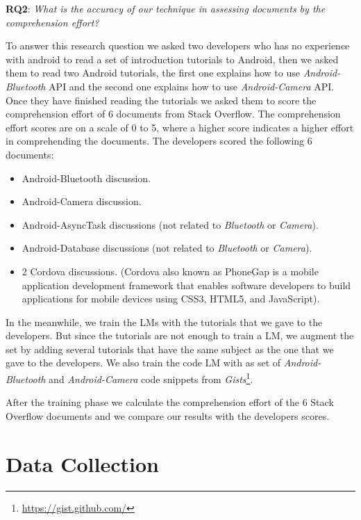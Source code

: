 \documentclass[12pt,mscthesis]{usiinfthesis}
\begin{document}
		{\textbf{RQ2}: \emph{What is the accuracy of our technique in assessing documents by the comprehension effort?}


		To answer this research question we asked two developers who has no experience with android to read a set of introduction tutorials to Android, then we asked them to read two Android tutorials, the first one explains how to use \emph{Android-Bluetooth} API and the second one explains how to use \emph{Android-Camera} API. Once they have finished reading the tutorials we asked them to score the comprehension effort of 6 documents from Stack Overflow. The comprehension effort scores are on a scale of 0 to 5, where a higher score indicates a higher effort in comprehending the documents. The developers scored the following 6 documents:

		\begin{itemize}
			\item   Android-Bluetooth discussion.
			\item   Android-Camera discussion.
			\item   Android-AsyncTask discussions (not related to \emph{Bluetooth} or \emph{Camera}).
			\item   Android-Database discussions (not related to \emph{Bluetooth} or \emph{Camera}).
			\item   2 Cordova discussions. (Cordova also known as PhoneGap is a mobile application development framework that enables software developers to build applications for mobile devices using CSS3, HTML5, and JavaScript).
		\end{itemize}

		In the meanwhile, we train the LMs with the tutorials that we gave to the developers. But since the tutorials are not enough to train a LM, we augment the set by adding several tutorials that have the same subject as the one that we gave to the developers. We also train the code LM with as set of \emph{Android-Bluetooth} and \emph{Android-Camera} code snippets from \emph{Gists}\footnote{\url{https://gist.github.com/}}.


		 After the training phase we calculate the comprehension effort of the 6 Stack Overflow documents and we compare our results with the developers scores.



	\section{Data Collection}	

}
\end{document}

